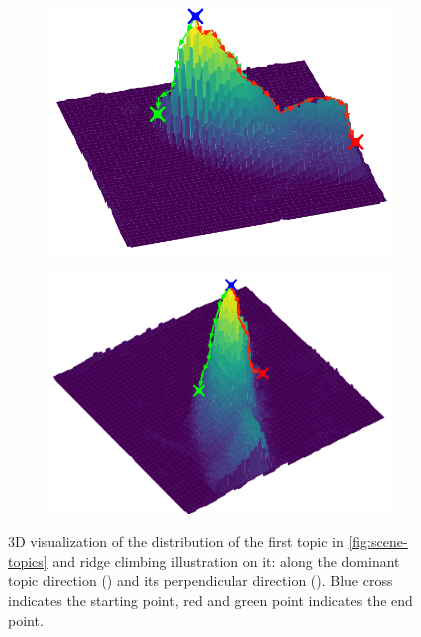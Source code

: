\begin{figure}
\centering
    \begin{subfigure}{0.48\linewidth}
        \includegraphics[width=\linewidth]{./img/scene_learning/ridge_climbing.pdf}
        \subcaption{}
        \label{subfig:scene-ridge-climbing}
    \end{subfigure}
    \begin{subfigure}{0.48\linewidth}
        \includegraphics[width=\linewidth]{./img/scene_learning/ridge_climbing_perp.pdf}
        \subcaption{}
        \label{subfig:scene-ridge-climbing-perp}
    \end{subfigure}%
    \caption{3D visualization of the distribution of the first topic in \ref{fig:scene-topics} and ridge climbing illustration on it: along the dominant topic direction () and its perpendicular direction (). Blue cross indicates the starting point, red and green point indicates the end point.}
    \label{fig:scene-ridge-clibming}
\end{figure}